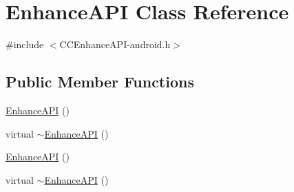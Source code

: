 \hypertarget{classEnhanceAPI}{}\section{Enhance\+A\+PI Class Reference}
\label{classEnhanceAPI}


{\ttfamily \#include $<$C\+C\+Enhance\+A\+P\+I-\/android.\+h$>$}

\subsection*{Public Member Functions}
\begin{DoxyCompactItemize}
\item 
\hyperlink{classEnhanceAPI_a38b0ef3cef705185a13174655fa62306}{Enhance\+A\+PI} ()
\item 
virtual \hyperlink{classEnhanceAPI_a50fcd2ce419536d19d01b6b9728cae67}{$\sim$\+Enhance\+A\+PI} ()
\item 
\hyperlink{classEnhanceAPI_a8ffc93de64bded476194d8fdc34cc8dd}{Enhance\+A\+PI} ()
\item 
virtual \hyperlink{classEnhanceAPI_a3b8bbecd1c52ed4e020c136a01194470}{$\sim$\+Enhance\+A\+PI} ()
\end{DoxyCompactItemize}
